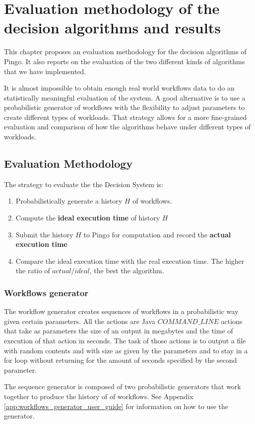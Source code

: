 \chapter{Evaluation methodology of the decision algorithms and results}
\label{chap:evaluation}
This chapter proposes an evaluation methodology for the decision algorithms of Pingo.  It also reports on the evaluation of the two different kinds of algorithms that we have implemented.

It is almost impossible to obtain enough real world workflows data to do an statistically meaningful evaluation of the system. A good alternative is to use a probabilistic generator of workflows with the flexibility to adjust parameters to create different types of workloads.  That strategy allows for a more fine-grained evaluation and comparison of how the algorithms behave under different types of workloads.

\section{Evaluation Methodology}
The strategy to evaluate the the Decision System is:
\begin{enumerate}
\item Probabilistically generate a history $H$ of workflows.
\item Compute the \textbf{ideal execution time} of history $H$
\item Submit the history $H$ to Pingo for computation and record the \textbf{actual execution time}
\item Compare the ideal execution time with the real execution time.  The higher the ratio of $actual/ideal$, the best the algorithm.
\end{enumerate}
\subsection{Workflows generator}
The workflow generator creates sequences of workflows in a probabilistic way given certain parameters. All the actions are Java $COMMAND\_LINE$ actions that take as parameters the size of an output in megabytes and the time of execution of that action in seconds.  The task of those actions is to output a file with random contents and with size as given by the parameters and to stay in a for loop without returning for the amount of seconds specified by the second parameter.

The sequence generator is composed of two probabilistic generators that work together to produce the history of of workflows.  See Appendix \ref{app:workflows_generator_user_guide} for information on how to use the generator.  

